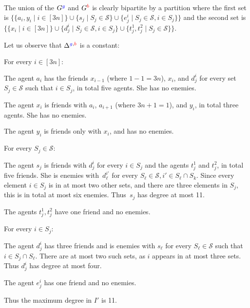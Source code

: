 \documentclass[a4paper,fleqn]{cas-sc}
\newcommand{\friendshipColor}{blue}
\newcommand{\enemyColor}{red}
\newcommand{\friendSuperscript}{{\color{\friendshipColor}g}}
\newcommand{\enemySuperscript}{{\color{\enemyColor}b}}
\newcommand{\friendshipGraph}{\ensuremath{G^{\friendSuperscript}}\xspace}
\newcommand{\enemyGraph}{\ensuremath{G^{\enemySuperscript}}\xspace}
\newcommand{\maxDegree}{\ensuremath{\Delta}}
\newcommand{\maxDegreeFE}{\ensuremath{\maxDegree^{\friendSuperscript,\enemySuperscript}}\xspace}
\newcommand{\sets}{\ensuremath{\mathcal{S}}}
\newcommand{\elements}{\ensuremath{[3n]}}
\newcommand{\sset}[1]{\ensuremath{S_{#1}}}
\begin{document}
{The union of the \friendshipGraph and \enemyGraph is clearly bipartite by a partition where the first set is $\{\{a_i, y_i \mid i \in \elements\} \cup \{s_j \mid \sset j \in \sets\}  \cup \{e^i_j \mid \sset j \in \sets, i \in \sset j\} \}$ and the second set is $\{\{x_i \mid i \in \elements\} \cup \{d^i_j \mid \sset j \in \sets, i \in \sset j\} \cup \{t^1_j, t^2_j \mid \sset j \in \sets\}\}$.

Let us observe that $\maxDegreeFE$ is a constant:
\begin{compactitem}
\item For every $i \in \elements$:
\begin{compactitem}
\item The agent $a_i$ has the friends $x_{i - 1}$ (where $1 -1 = 3n$), $x_i$, and $d^i_j$ for every set $\sset j \in \sets$ such that $i \in \sset j$, in total five agents. She has no enemies.
\item The agent $x_i$ is friends with $a_i$, $a_{i + 1}$ (where $3n + 1 = 1$), and $y_i$, in total three agents. She has no enemies.
\item The agent $y_i$ is friends only with $x_i$, and has no enemies.
\end{compactitem}
\item For every $\sset j \in \sets$:
\begin{compactitem}
\item The agent $s_j$ is friends with $d^i_j$ for every $i \in \sset j$ and the agents $t^1_j$ and $t^2_j$, in total five friends. She is enemies with~$d^{i'}_\ell$ for every $\sset \ell \in \sets, i' \in \sset \ell \cap \sset k$. Since every element $i \in \sset j$ is in at most two other sets, and there are three elements in \sset j, this is in total at most six enemies.
Thus~$s_j$ has degree at most 11.
\item The agents $t^1_j, t^2_j$ have one friend and no enemies.
\item For every $i \in \sset j$:
\begin{compactitem}
\item The agent $d^i_j$ has three friends and is enemies with $s_\ell$ for every $\sset \ell \in \sets$ such that $i \in \sset j \cap \sset \ell$. There are at most two such sets, as $i$ appears in at most three sets. 
Thus $d^i_j$ has degree at most four.
\item The agent $e^i_j$ has one friend and no enemies.
\end{compactitem}
\end{compactitem}
\end{compactitem}
Thus the maximum degree in $I'$ is 11.

}
\end{document}

